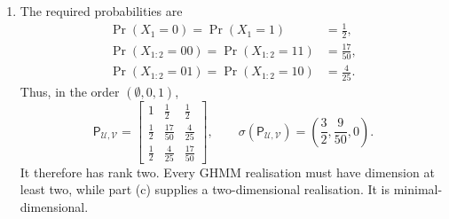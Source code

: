 \begin{solution}[ex:p3-4]
\begin{enumerate}
\begin{enumerate}
          \item The required probabilities are
            \[
              \begin{aligned}
                \Pr(X_1=0)=\Pr(X_1=1)&=\frac12,\\
                \Pr(X_{1:2}=00)=\Pr(X_{1:2}=11)&=\frac{17}{50},\\
                \Pr(X_{1:2}=01)=\Pr(X_{1:2}=10)&=\frac4{25}.
              \end{aligned}
            \]
            Thus, in the order $(\emptyset,0,1)$,
            \[
              \mathsf P_{\mathcal U,\mathcal V}
                =
                \begin{bmatrix}
                  1&\tfrac12&\tfrac12\\
                  \tfrac12&\tfrac{17}{50}&\tfrac4{25}\\
                  \tfrac12&\tfrac4{25}&\tfrac{17}{50}
                \end{bmatrix},
              \qquad
              \sigma(\mathsf P_{\mathcal U,\mathcal V})
                =\left(\frac32,\frac9{50},0\right).
            \]
            It therefore has rank two. Every GHMM realisation must have
            dimension at least two, while part (c) supplies a
            two-dimensional realisation. It is minimal-dimensional.
        \end{enumerate}

    \end{enumerate}
\end{solution}

